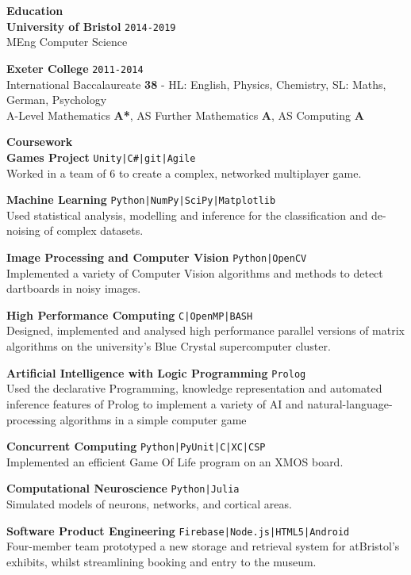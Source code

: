 \documentclass[10pt]{article}
\newcommand{\sect}[1]{{\LARGE{\textbf{#1}}}\vspace{0.1em}\\}
\newcommand{\zz}[3]{{\large\textbf{#1}} \hfill {\small \colorbox{boxcol}{\texttt{#3}} }\\{#2}\vspace{0.5em}}
\newcommand{\li}{\textcolor{linecol}{|}}
\begin{document}
\begin{minipage}[t]{0.66\textwidth}







\sect{Education}
\zz{University of Bristol}{MEng Computer Science}{2014-2019}

\zz{Exeter College}{International Baccalaureate \textbf{38} {\scriptsize - HL: English, Physics, Chemistry, SL: Maths, German, Psychology}\\
A-Level Mathematics \textbf{A*}, 
AS Further Mathematics \textbf{A}, AS Computing \textbf{A}}{2011-2014}






\vspace{0.5em}




\raggedright
\sect{Coursework}
\zz{Games Project}
{Worked in a team of 6 to create a complex, networked multiplayer game.}{Unity\li C\#\li git\li Agile}

\zz{Machine Learning}
{Used statistical analysis, modelling and inference for the classification and de-noising of complex datasets.}{Python\li NumPy\li SciPy\li Matplotlib}

\zz{Image Processing and Computer Vision}
{Implemented a variety of Computer Vision algorithms and methods to detect dartboards in noisy images.}{Python\li OpenCV}

\zz{High Performance Computing}
{Designed, implemented and analysed high performance parallel versions of matrix algorithms on the university’s Blue Crystal supercomputer cluster.}{C\li OpenMP\li BASH}

\zz{Artificial Intelligence with Logic Programming}
{Used the declarative Programming, knowledge representation and automated inference features of Prolog to implement a variety of AI and natural-language-processing algorithms in a simple computer game}{Prolog}

\zz{Concurrent Computing}
{Implemented an efficient Game Of Life program on an XMOS board.}{Python\li PyUnit\li C\li XC\li CSP}

\zz{Computational Neuroscience}
{Simulated models of neurons, networks, and cortical areas.}{Python\li Julia}

\zz{Software Product Engineering}
{Four-member team prototyped a new storage and retrieval system for atBristol's exhibits, whilst streamlining booking and entry to the museum.}{Firebase\li Node.js\li HTML5\li Android}


\end{minipage}
\end{document}
